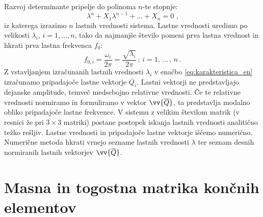         Razvoj determinante pripelje do polinoma $n$-te stopnje:
        \begin{equation}
            \lambda^{n}+X_1\lambda^{n-1}+...+X_n=0\text{ ,}
        \end{equation}
        iz katerega izrazimo $n$ lastnih vrednosti sistema. Lastne vrednosti uredimo po velikosti $\lambda_i$, $i=1, ..., n$, tako da najmanjše število pomeni prva lastna vrednost in hkrati prva lastna frekvenca $f_0$:
        \begin{equation}\label{eq:lastna_frekvenca}
            f_{0,i}=\frac{\omega_{i}}{2 \pi}=\frac{\sqrt{\lambda_i}}{2 \pi} \, \textrm{; } i=1,\, ...\,,\,n \,.
        \end{equation}
        Z vstavljanjem izračunanih lastnih vrednosti $\lambda_i$ v enačbo \eqref{eq:karakteristica_en} izračunamo pripadajoče lastne vektorje $\overline{Q}_i$. Lastni vektorji ne predstavljajo dejanske amplitude, temveč medsebojno relativne vrednosti. Če te relativne vrednosti normiramo in formuliramo v vektor $\vv{\overline{Q}}$, ta predstavlja modalno obliko pripadajoče lastne frekvence. 
        V sistemu z velikim številom matrik (v resnici že pri $3 \times 3$ matriki) postane postopek iskanja lastnih vrednosti analitično težko rešljiv. Lastne vrednosti in pripadajoče lastne vektorje iščemo numerično. Numerične metoda hkrati vrnejo sezname lastnih vrednosti $\lambda$ ter seznam desnih normiranih lastnih vektorjev $\vv{\overline{Q}}$. 
        
    \newpage
    \section{Masna in togostna matrika končnih elementov}
        
